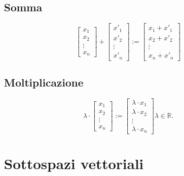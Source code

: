 \documentclass[a4paper, 12pt]{report}
\begin{document}
            \subsection{Somma}
                $$
                \begin{bmatrix}
                    x_1\\
                    x_2\\
                    \vdots\\
                    x_n    
                \end{bmatrix}
                +
                \begin{bmatrix}
                    x'_1\\
                    x'_2\\
                    \vdots\\
                    x'_n    
                \end{bmatrix}
                :=
                \begin{bmatrix}
                    x_1+x'_1\\
                    x_2+x'_2\\
                    \vdots\\
                    x_n+x'_n    
                \end{bmatrix}
                $$
            \subsection{Moltiplicazione}
                $$
                \lambda \cdot
                \begin{bmatrix}
                    x_1\\
                    x_2\\
                    \vdots\\
                    x_n    
                \end{bmatrix}
                := 
                \begin{bmatrix}
                    \lambda \cdot x_1\\
                    \lambda \cdot x_2\\
                    \vdots\\
                    \lambda \cdot x_n    
                \end{bmatrix}
                \lambda \in \mathbb{R}.
                $$
            \clearpage
            \section{Sottospazi vettoriali}
\end{document}
